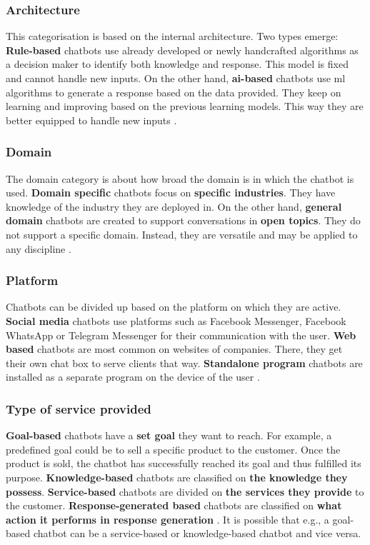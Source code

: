 \subsubsection{Architecture}
This categorisation is based on the internal architecture. Two types emerge: \textbf{Rule-based} chatbots use already developed or newly handcrafted algorithms as a decision maker to identify both knowledge and response. This model is fixed and cannot handle new inputs. On the other hand, \textbf{\acrshort{ai}-based} chatbots use \acrlong{ml} algorithms to generate a response based on the data provided. They keep on learning and improving based on the previous learning models. This way they are better equipped to handle new inputs \citep{Maroengsit2019}.

\subsubsection{Domain}
The domain category is about how broad the domain is in which the chatbot is used. \textbf{Domain specific} chatbots focus on \textbf{specific industries}. They have knowledge of the industry they are deployed in. On the other hand, \textbf{general domain} chatbots are created to support conversations in \textbf{open topics}. They do not support a specific domain. Instead, they are versatile and may be applied to any discipline \citep{Maroengsit2019}.

\subsubsection{Platform}
Chatbots can be divided up based on the platform on which they are active. \textbf{Social media} chatbots use platforms such as Facebook Messenger, Facebook WhatsApp or Telegram Messenger for their communication with the user. \textbf{Web based} chatbots are most common on websites of companies. There, they get their own chat box to serve clients that way. \textbf{Standalone program} chatbots are installed as a separate program on the device of the user \citep*{Maroengsit2019, Xu2017, CICBA2018}.

\subsubsection{Type of service provided}
\textbf{Goal-based} chatbots have a \textbf{set goal} they want to reach. For example, a predefined goal could be to sell a specific product to the customer. Once the product is sold, the chatbot has successfully reached its goal and thus fulfilled its purpose. \textbf{Knowledge-based} chatbots are classified on \textbf{the knowledge they possess}. \textbf{Service-based} chatbots are divided on \textbf{the services they provide} to the customer. \textbf{Response-generated based} chatbots are classified on \textbf{what action it performs in response generation} \citep{Nuruzzaman2018}. It is possible that e.g., a goal-based chatbot can be a service-based or knowledge-based chatbot and vice versa.

